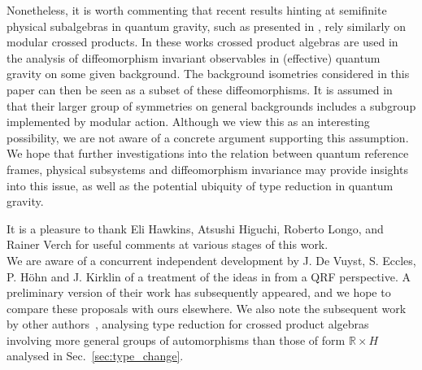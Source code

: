 \documentclass[sn-mathphys-num]{sn-jnl}%
\numberwithin{equation}{section}
\theoremstyle{thmstyleone}%
\theoremstyle{thmstyletwo}%
\theoremstyle{thmstylethree}%
\begin{document}
Nonetheless, it is worth commenting that recent results hinting at semifinite physical subalgebras in quantum gravity, such as presented in \cite{witten2022gravity,jensenGeneralizedEntropyGeneral2023,kudler-flamGeneralizedBlackHole2024}, rely similarly on modular crossed products. In these works crossed product algebras are used in the analysis of diffeomorphism invariant observables in (effective) quantum gravity on some given background. The background isometries considered in this paper can then be seen as a subset of these diffeomorphisms. It is assumed in \cite{jensenGeneralizedEntropyGeneral2023} that their larger group of symmetries on general backgrounds includes a subgroup implemented by modular action. Although we view this as an interesting possibility, we are not aware of a concrete argument supporting this assumption. We hope that further investigations into the relation between quantum reference frames, physical subsystems and diffeomorphism invariance may provide insights into this issue, as well as the potential ubiquity of type reduction in quantum gravity.

\backmatter

%
%
%


It is a pleasure to thank Eli Hawkins, Atsushi Higuchi, Roberto Longo, and Rainer Verch for useful comments at various stages of this work. \\

We are aware of a concurrent independent development by J. De Vuyst, S. Eccles, P. H\"{o}hn and J. Kirklin of a treatment of the ideas in \cite{chandrasekaran2023algebra} from a QRF perspective. A preliminary version of their work \cite{devuystGravitationalEntropyObserverdependent2024} has subsequently appeared, and we hope to compare these proposals with ours elsewhere. We also note the subsequent work by other authors~\cite{aliahmadSemifiniteNeumannAlgebras2024}, analysing type reduction for crossed product algebras involving more general groups of automorphisms than those of form $\mathbb{R}\times H$ analysed in Sec.~\ref{sec:type_change}.
\end{document}

